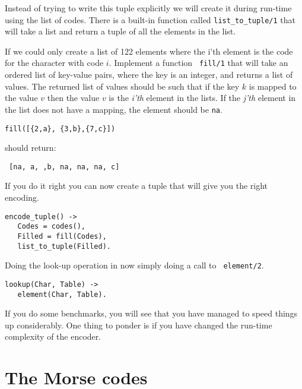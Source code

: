 \documentclass[a4paper,11pt]{article}
\newcommand{\nnsection}[1]{
\section*{#1}
\addcontentsline{toc}{section}{#1}
}
\begin{document}
Instead of trying to write this tuple explicitly we will create it
during run-time using the list of codes. There is a built-in function
called {\tt list\_to\_tuple/1} that will take a list and return a
tuple of all the elements in the list.

If we could only create a list of 122 elements where the i'th element
is the code for the character with code $i$. Implement a function {\tt
  fill/1} that will take an ordered list of key-value pairs, where the
key is an integer, and returns a list of values. The returned list of
values should be such that if the key $k$ is mapped to the value $v$
then the value $v$ is the {\em i'th} element in the lists. If the {\em
  j'th} element in the list does not have a mapping, the element
should be {\tt na}.

\begin{verbatim}
fill([{2,a}, {3,b},{7,c}])
\end{verbatim}

should return:

\begin{verbatim}
 [na, a, ,b, na, na, na, c]
\end{verbatim}

If you do it right you can now create a tuple that will give you the
right encoding.

\begin{verbatim}
encode_tuple() ->
   Codes = codes(),
   Filled = fill(Codes),
   list_to_tuple(Filled).
\end{verbatim}

Doing the look-up operation in now simply doing a call to {\tt
  element/2}.

\begin{verbatim}
lookup(Char, Table) ->
   element(Char, Table).
\end{verbatim}

If you do some benchmarks, you will see that you have managed to
speed things up considerably. One thing to ponder is if you have
changed the run-time complexity of the encoder.

\newpage
\nnsection{The Morse codes}
\end{document}
